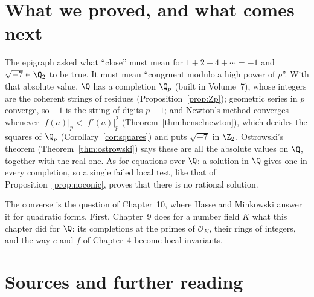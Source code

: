 \section{What we proved, and what comes next}

The epigraph asked what ``close'' must mean for $1+2+4+\cdots=-1$ and $\sqrt{-7}\in\Q_2$ to be true. It must mean
``congruent modulo a high power of $p$''. With that absolute value, $\Q$ has a completion $\Q_p$ (built in Volume~7), whose
integers are the coherent strings of residues (Proposition~\ref{prop:Zp}); geometric series in $p$ converge, so $-1$ is the
string of digits $p-1$; and Newton's method converges whenever $|f(a)|_p<|f'(a)|_p^2$ (Theorem~\ref{thm:henselnewton}), which
decides the squares of $\Q_p$ (Corollary~\ref{cor:squares}) and puts $\sqrt{-7}$ in $\Z_2$. Ostrowski's theorem
(Theorem~\ref{thm:ostrowski}) says these are all the absolute values on $\Q$, together with the real one. As for equations
over $\Q$: a solution in $\Q$ gives one in every completion, so a single failed local test, like that of
Proposition~\ref{prop:noconic}, proves that there is no rational solution.

The converse is the question of Chapter~10, where Hasse and Minkowski answer it for quadratic forms. First, Chapter~9 does for
a number field $K$ what this chapter did for $\Q$: its completions at the primes of $\mathcal O_K$, their rings of integers, and
the way $e$ and $f$ of Chapter~4 become local invariants.

\section*{Sources and further reading}

